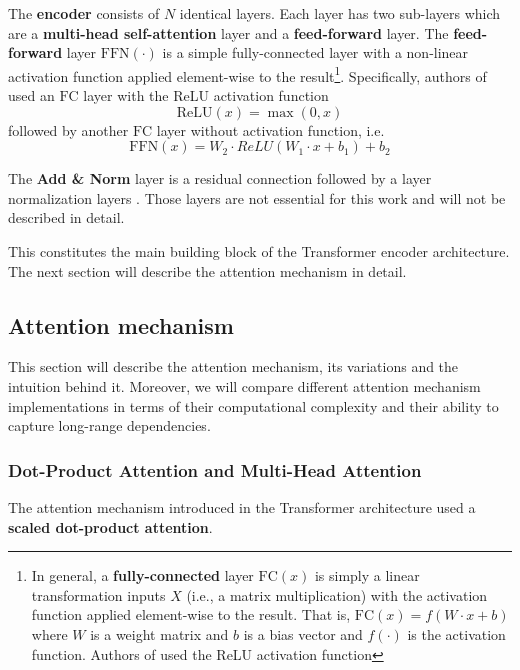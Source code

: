 \documentclass[a4paper, twoside]{report}
\theoremstyle{definition}
\numberwithin{equation}{section}
\begin{document}
The \textbf{encoder} consists of $N$ identical layers. Each layer has two sub-layers which are a
\textbf{multi-head self-attention} layer and
a \textbf{feed-forward} layer.
The \textbf{feed-forward} layer $\text{FFN}(\cdot)$ is a simple fully-connected layer
with a non-linear activation function applied element-wise to the
result\footnote{
    In general, a \textbf{fully-connected} layer $\text{FC}(x)$ is simply a linear transformation inputs $X$ (i.e., a matrix multiplication) with the activation function applied element-wise to the result.
    That is, $\text{FC}(x)=f(W\cdot x + b)$ where $W$ is a weight matrix and $b$ is a bias vector and $f(\cdot)$ is the activation function.
    Authors of \cite{1706.03762} used the ReLU activation function
}.
Specifically, authors of \cite{1706.03762} used an $\text{FC}$ layer with
the ReLU activation function $$\text{ReLU}(x)=\max(0, x)$$
followed by another $\text{FC}$ layer without activation function, i.e.
$$\text{FFN}(x)=W_2 \cdot ReLU(W_1\cdot x+b_1)+b_2$$

The \textbf{Add \& Norm} layer is a residual connection \cite{1512.03385} followed by a layer normalization layers \cite{1607.06450}.
Those layers are not essential for this work and will not be described in detail.

This constitutes the main building block of the Transformer encoder architecture.
The next section will describe the attention mechanism in detail.


\subsection{Attention mechanism} \label{sec:attention_mechanism}

This section will describe the attention mechanism, its variations and the intuition behind it.
Moreover, we will compare different attention mechanism implementations in terms of
their computational complexity and their ability to capture long-range dependencies.

\subsubsection{Dot-Product Attention and Multi-Head Attention}


The attention mechanism introduced in the Transformer architecture \cite{1706.03762} used a \textbf{scaled dot-product attention}.
\end{document}
